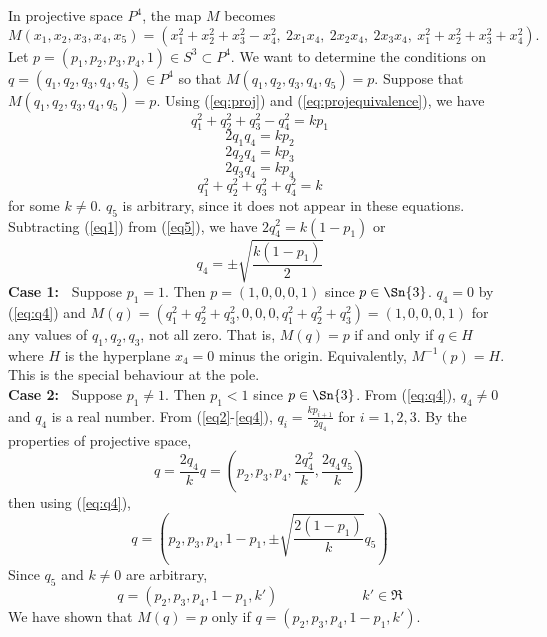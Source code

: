 \documentclass[12pt]{article}
\begin{document}
\vspace{.1in}

\prf
In projective space $P^4$, the map $M$ becomes
\begin{equation}
\label{eq:proj}
	 M(x_1,x_2,x_3,x_4,x_5) =
	 (x_1^2 + x_2^2 + x_3^2 - x_4^2,\ 
	 2x_1 x_4,\ 2x_2 x_4,\ 2x_3 x_4,\ 
	 x_1^2 + x_2^2 + x_3^2 + x_4^2).
\end{equation}
Let $p = (p_1,p_2,p_3,p_4,1) \in S^3 \subset P^4$.
We want to determine the conditions on $q = (q_1,q_2,q_3,q_4,q_5) \in P^4$
so that $M(q_1,q_2,q_3,q_4,q_5) = p$.
Suppose that $M(q_1,q_2,q_3,q_4,q_5) = p$.
Using (\ref{eq:proj}) and (\ref{eq:projequivalence}), we have
\begin{equation}
\label{eq1}
	q_1^2 + q_2^2 + q_3^2 - q_4^2 = kp_1
\end{equation}
\begin{equation}
\label{eq2}
	2q_1q_4	= kp_2
\end{equation}
\begin{equation}
\label{eq3}
	2q_2q_4	= kp_3
\end{equation}
\begin{equation}
\label{eq4}
	2q_3q_4	= kp_4
\end{equation}
\begin{equation}
\label{eq5}
	q_1^2 + q_2^2 + q_3^2 + q_4^2 = k
\end{equation}
for some $k \neq 0$.
$q_5$ is arbitrary, since it does not appear in these equations.
Subtracting (\ref{eq1}) from (\ref{eq5}), 
we have $2q_4^2 = k(1 - p_1)$
or 
\begin{equation}
\label{eq:q4}
q_4 = \pm \sqrt{\frac{k(1-p_1)}{2}}
\end{equation}
%
{\bf Case 1:\ }
Suppose $p_1 = 1$. Then $p = (1,0,0,0,1)$ since $p \in \Sn{3}$.
$q_4 = 0$ by (\ref{eq:q4})
and $M(q) = (q_1^2 + q_2^2 + q_3^2, 0, 0, 0, q_1^2 + q_2^2 + q_3^2)
       = (1,0,0,0,1)$ for any values of $q_1,q_2,q_3$, not all zero.
That is, $M(q) = p$ if and only if $q \in H$ where $H$ is 
the hyperplane $x_4 = 0$ minus the origin.
Equivalently, $M^{-1}(p) = H$.
This is the special behaviour at the pole.\\
%
{\bf Case 2:\ }
Suppose $p_1 \neq 1$.
Then $p_1 < 1$ since $p \in \Sn{3}$. 
From (\ref{eq:q4}), $q_4 \neq 0$ and $q_4$ is a real number.
From (\ref{eq2}-\ref{eq4}), $q_i = \frac{kp_{i+1}}{2q_4}$ for $i=1,2,3$.
By the properties of projective space, 
\[
	q = \frac{2q_4}{k} q
	  = (p_2, p_3, p_4, \frac{2q_4^2}{k},\frac{2q_4q_5}{k})
\]
then using (\ref{eq:q4}),
\[
	q = (p_2,p_3,p_4,1-p_1, \pm \sqrt{\frac{2(1-p_1)}{k}} q_5)
\]
Since $q_5$ and $k \neq 0$ are arbitrary,
\[
	q = (p_2,p_3,p_4,1-p_1, k') \hspace{1in} k' \in \Re
\]
We have shown that $M(q) = p$ only if 
$q = (p_2,p_3,p_4,1 - p_1,k')$.
\end{document}
